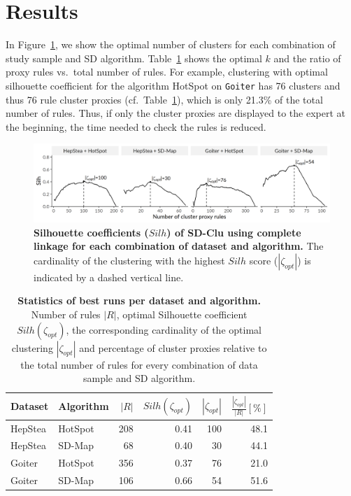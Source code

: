\documentclass[
  oneside]{book}
\begin{document}
\hypertarget{sdclu-results}{%
\section{Results}\label{sdclu-results}}

In Figure~\ref{fig:04-silh-comparison}, we show the optimal number of clusters for each combination of study sample and SD algorithm.
Table~\ref{tab:04-silh} shows the optimal \(k\) and the ratio of proxy rules vs.~total number of rules.
For example, clustering with optimal silhouette coefficient for the algorithm HotSpot on \texttt{Goiter} has 76 clusters and thus 76 rule cluster proxies (cf.~Table~\ref{tab:04-silh}), which is only 21.3\% of the total number of rules.
Thus, if only the cluster proxies are displayed to the expert at the beginning, the time needed to check the rules is reduced.



\begin{figure}[htbp]

{\centering \includegraphics[width=1\linewidth]{figures/04-silh-comparison} 

}

\caption{\textbf{Silhouette coefficients (\(Silh\)) of SD-Clu using complete linkage for each combination of dataset and algorithm.} The cardinality of the clustering with the highest \(Silh\) score (\(|\zeta_{opt}|\)) is indicated by a dashed vertical line.}\label{fig:04-silh-comparison}
\end{figure}



\begin{table}

\caption{\label{tab:04-silh}\textbf{Statistics of best runs per dataset and algorithm.} Number of rules \(|R|\), optimal Silhouette coefficient \(Silh(\zeta_{opt})\), the corresponding cardinality of the optimal clustering \(|\zeta_{opt}|\) and percentage of cluster proxies relative to the total number of rules for every combination of data sample and SD algorithm.}
\centering
\begin{tabular}[t]{llrrrr}
\toprule
Dataset & Algorithm & $|R|$ & $Silh(\zeta_{opt})$ & $|\zeta_{opt}|$ & $\frac{|\zeta_{opt}|}{|R|} [\%]$\\
\midrule
HepStea & HotSpot & 208 & 0.41 & 100 & 48.1\\
HepStea & SD-Map & 68 & 0.40 & 30 & 44.1\\
Goiter & HotSpot & 356 & 0.37 & 76 & 21.0\\
Goiter & SD-Map & 106 & 0.66 & 54 & 51.6\\
\bottomrule
\end{tabular}
\end{table}
\end{document}
